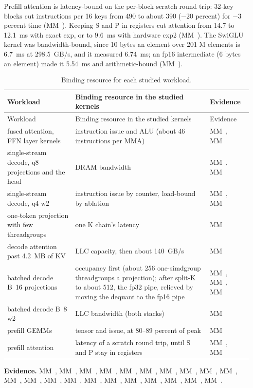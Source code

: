 Prefill attention is latency-bound on the per-block scratch round trip: 32-key blocks cut instructions per 16 keys
from 490 to about 390 (−20 percent) for −3 percent time (MM~). Keeping S and P in registers cut attention
from 14.7 to 12.1~ms with exact exp, or to 9.6~ms with hardware exp2 (MM~). The SwiGLU kernel was bandwidth-bound, since 10
bytes an element over 201 M elements is 6.7~ms at 298.5~GB/s, and it measured 6.74~ms; an fp16 intermediate (6 bytes an
element) made it 5.54~ms and arithmetic-bound (MM~).

\begin{xltabular}{\linewidth}{@{}X>{\hsize}X>{\hsize}X@{}}
\caption{Binding resource for each studied workload.}\label{tab:binding-resources}\\
\toprule
Workload & Binding resource in the studied kernels & Evidence \\
\midrule
\endfirsthead
{}
\toprule
Workload & Binding resource in the studied kernels & Evidence \\
\midrule
\endhead
fused attention, FFN layer kernels & instruction issue and ALU (about 46 instructions per MMA) & MM~, MM~ \\*
single-stream decode, q8 projections and the head & DRAM bandwidth & MM~, MM~ \\*
single-stream decode, q4 w2 & instruction issue by counter, load-bound by ablation & MM~, MM~ \\*
one-token projection with few threadgroups & one K chain's latency & MM~ \\*
decode attention past 4.2~MB of KV & LLC capacity, then about 140~GB/s & MM~ \\*
batched decode B~16 projections & occupancy first (about 256 one-simdgroup threadgroups a projection);
after split-K to about 512, the fp32 pipe, relieved by moving the
dequant to the fp16 pipe & MM~, MM~, MM~ \\*
batched decode B~8 w2 & LLC bandwidth (both stacks) & MM~ \\*
prefill GEMMs & tensor and issue, at 80–89 percent of peak & MM~ \\*
prefill attention & latency of a scratch round trip, until S and P stay in registers & MM~, MM~ \\*
\bottomrule
\end{xltabular}

\textbf{Evidence.} MM~, MM~, MM~, MM~, MM~, MM~, MM~, MM~, MM~,
MM~, MM~, MM~, MM~, MM~, MM~, MM~, MM~, MM~, MM~,
MM~, MM~.
